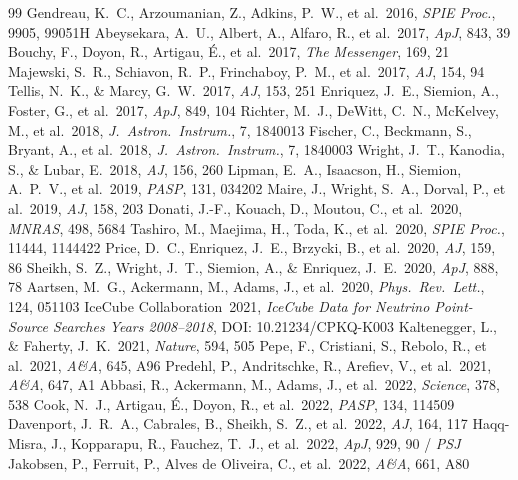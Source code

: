 \documentclass[twocolumn,10pt]{article}
\begin{document}
\begin{thebibliography}{99}
 Gendreau, K.~C., Arzoumanian, Z., Adkins, P.~W., et al.\ 2016, \textit{SPIE Proc.}, 9905, 99051H
 Abeysekara, A.~U., Albert, A., Alfaro, R., et al.\ 2017, \textit{ApJ}, 843, 39
 Bouchy, F., Doyon, R., Artigau, \'{E}., et al.\ 2017, \textit{The Messenger}, 169, 21
 Majewski, S.~R., Schiavon, R.~P., Frinchaboy, P.~M., et al.\ 2017, \textit{AJ}, 154, 94
 Tellis, N.~K., \& Marcy, G.~W.\ 2017, \textit{AJ}, 153, 251
 Enriquez, J.~E., Siemion, A., Foster, G., et al.\ 2017, \textit{ApJ}, 849, 104
 Richter, M.~J., DeWitt, C.~N., McKelvey, M., et al.\ 2018, \textit{J.\ Astron.\ Instrum.}, 7, 1840013
 Fischer, C., Beckmann, S., Bryant, A., et al.\ 2018, \textit{J.\ Astron.\ Instrum.}, 7, 1840003
 Wright, J.~T., Kanodia, S., \& Lubar, E.\ 2018, \textit{AJ}, 156, 260
 Lipman, E.~A., Isaacson, H., Siemion, A.~P.~V., et al.\ 2019, \textit{PASP}, 131, 034202
 Maire, J., Wright, S.~A., Dorval, P., et al.\ 2019, \textit{AJ}, 158, 203
 Donati, J.-F., Kouach, D., Moutou, C., et al.\ 2020, \textit{MNRAS}, 498, 5684
 Tashiro, M., Maejima, H., Toda, K., et al.\ 2020, \textit{SPIE Proc.}, 11444, 1144422
 Price, D.~C., Enriquez, J.~E., Brzycki, B., et al.\ 2020, \textit{AJ}, 159, 86
 Sheikh, S.~Z., Wright, J.~T., Siemion, A., \& Enriquez, J.~E.\ 2020, \textit{ApJ}, 888, 78
 Aartsen, M.~G., Ackermann, M., Adams, J., et al.\ 2020, \textit{Phys.\ Rev.\ Lett.}, 124, 051103
 IceCube Collaboration\ 2021, \textit{IceCube Data for Neutrino Point-Source Searches Years 2008--2018}, DOI: 10.21234/CPKQ-K003
 Kaltenegger, L., \& Faherty, J.~K.\ 2021, \textit{Nature}, 594, 505
 Pepe, F., Cristiani, S., Rebolo, R., et al.\ 2021, \textit{A\&A}, 645, A96
 Predehl, P., Andritschke, R., Arefiev, V., et al.\ 2021, \textit{A\&A}, 647, A1
 Abbasi, R., Ackermann, M., Adams, J., et al.\ 2022, \textit{Science}, 378, 538
 Cook, N.~J., Artigau, \'{E}., Doyon, R., et al.\ 2022, \textit{PASP}, 134, 114509
 Davenport, J.~R.~A., Cabrales, B., Sheikh, S.~Z., et al.\ 2022, \textit{AJ}, 164, 117
 Haqq-Misra, J., Kopparapu, R., Fauchez, T.~J., et al.\ 2022, \textit{ApJ}, 929, 90 / \textit{PSJ}
 Jakobsen, P., Ferruit, P., Alves de Oliveira, C., et al.\ 2022, \textit{A\&A}, 661, A80

\end{thebibliography}
\end{document}
